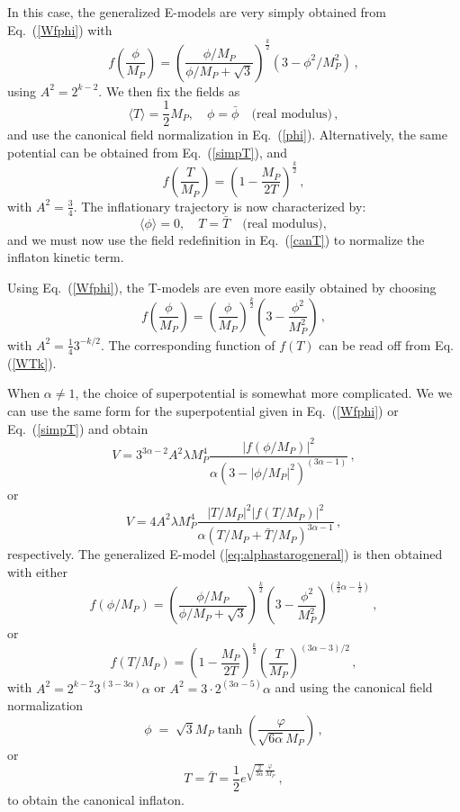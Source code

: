 \documentclass[aps,prev,twocolumn,preprintnumbers,floatfix,nofootinbib]{revtex4-1}
\newcommand{\beq}{\begin{equation}}
\newcommand{\eeq}{\end{equation}}
\begin{document}
In this case, the generalized E-models are very simply obtained from Eq.~(\ref{Wfphi}) with
\beq
f\left(\frac{\phi}{M_P}\right) = \left(\frac{\phi/M_P}{\phi/M_P+\sqrt{3}}\right)^{\frac{k}{2}} \left(3-\phi^2/M_P^2\right) \, ,
\eeq
using $A^2 = 2^{k-2}$. We then fix the fields as
\begin{equation}
\langle T \rangle = \frac{1}{2}M_P, \quad \phi = \bar{\phi} \quad \text{(real modulus)} \,,
\end{equation}
and use the canonical field normalization 
in Eq.~(\ref{phi}).
Alternatively, the same potential can be obtained from Eq.~(\ref{simpT}), and 
\beq
f\left(\frac{T}{M_P} \right) = \left(1-\frac{M_P}{2T}\right)^\frac{k}{2} \, ,
\eeq
with $A^2 = \frac34$.
The inflationary trajectory is now characterized by:
\begin{equation}
\langle \phi \rangle = 0, \quad T = \bar{T} \quad \text{(real modulus)},
\end{equation}
and we must now use the field redefinition in Eq.~(\ref{canT})
to normalize the inflaton kinetic term. 


Using Eq.~(\ref{Wfphi}), the T-models are even more easily obtained by choosing
\beq
f\left(\frac{\phi}{M_P} \right) = \left(\frac{\phi}{M_P} \right)^{\frac{k}{2}} \left(3-\frac{\phi^2}{M_P^2}\right) \,,
\eeq
with $A^2 = \frac14 3^{-k/2}$. The corresponding function of $f(T)$ can be read off from Eq.(\ref{WTk}). 

When $\alpha \ne 1$, the choice of superpotential is somewhat more complicated. We we can use the same form for the superpotential given in Eq.~(\ref{Wfphi}) or Eq.~(\ref{simpT}) and obtain
\beq
V = 3^{3\alpha-2} A^2 \lambda M_P^4 \frac{|f(\phi/M_P)|^2}{\alpha \left(3-|\phi/M_P|^2\right)^{(3\alpha-1)}} \, ,
\eeq
or
\beq
V = 4 A^2 \lambda M_P^4 \frac{|T/M_P|^2 |f(T/M_P)|^2}{\alpha (T/M_P+{\bar T}/M_P)^{3\alpha-1}} \, ,
\eeq
respectively. The generalized E-model (\ref{eq:alphastarogeneral}) is then obtained with either
\beq
f(\phi/M_P) = \left(\frac{\phi/M_P}{\phi/M_P+\sqrt{3}}\right)^{\frac{k}{2}} \left(3-\frac{\phi^2}{M_P^2}\right)^{(\frac32 \alpha - \frac12)} \, ,
\eeq
or
\beq
f(T/M_P) = \left(1-\frac{M_P}{2T} \right)^\frac{k}{2} \left(\frac{T}{M_P} \right)^{(3 \alpha -3)/2} \, ,
\eeq
with $A^2 = 2^{k-2} 3^{(3-3\alpha)} \alpha$ or $A^2 = 3 \cdot 2^{(3\alpha-5)} \alpha$ and using the canonical field normalization 
\begin{equation}
    \label{eq:phicanonical1}
    \phi \; = \; \sqrt{3} M_P \tanh(\frac{\varphi}{\sqrt{6 \alpha} M_P}) \, ,
\end{equation} or 
\begin{equation}
\label{eq:tcanonicalfield}
T = \bar{T} = \frac{1}{2}e^{\sqrt{\frac{2}{3\alpha}} \frac{\varphi}{M_P}}\,,
\end{equation}
to obtain the canonical inflaton. 
\end{document}
